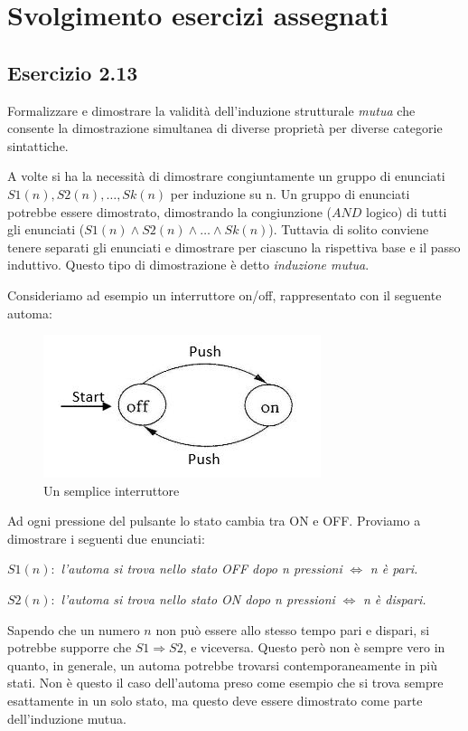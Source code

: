 \chapter{Svolgimento esercizi assegnati}
	\section{Esercizio 2.13}
		Formalizzare e dimostrare la validit\`a dell'induzione strutturale
		\emph{mutua} che consente la dimostrazione simultanea di diverse propriet\`a
		per diverse categorie sintattiche.
		
		\sectionline
		
		A volte si ha la necessit\`a di dimostrare congiuntamente un gruppo di
		enunciati $S1(n),S2(n),\ldots,Sk(n)$ per induzione su n. Un gruppo di
		enunciati potrebbe essere dimostrato, dimostrando la congiunzione ($AND$
		logico) di tutti gli enunciati ($S1(n)\land S2(n)\land \ldots \land Sk(n)$).
		Tuttavia di solito conviene tenere separati gli enunciati e dimostrare per
		ciascuno la rispettiva base e il passo induttivo. Questo tipo di dimostrazione
		\`e detto \emph{induzione mutua}.
		
		Consideriamo ad esempio un interruttore on/off, rappresentato con il seguente
		automa:
		
		\begin{figure}[h]
			\centering
			\includegraphics[scale=1]{img/Interruttore}
			\caption{Un semplice interruttore}
		\end{figure}
		
		Ad ogni pressione del pulsante lo stato cambia tra ON e OFF. Proviamo a
		dimostrare i seguenti due enunciati:
		
		$S1(n):$ \emph{l'automa si trova nello stato OFF dopo n pressioni}
		$\Leftrightarrow$ \emph{n \`e pari.}
		
		$S2(n):$ \emph{l'automa si trova nello stato ON dopo n pressioni}
		$\Leftrightarrow$ \emph{n \`e dispari.}
		
		Sapendo che un numero $n$ non pu\`{o} essere allo stesso tempo pari e dispari, si
		potrebbe supporre che $S1 \Rightarrow S2$, e viceversa. Questo per\`{o} non \`{e}
		sempre vero in quanto, in generale, un automa potrebbe trovarsi
		contemporaneamente in pi\`{u} stati. Non \`{e} questo il caso dell'automa preso come
		esempio che si trova sempre esattamente in un solo stato, ma questo deve
		essere dimostrato come parte dell'induzione mutua.
		
